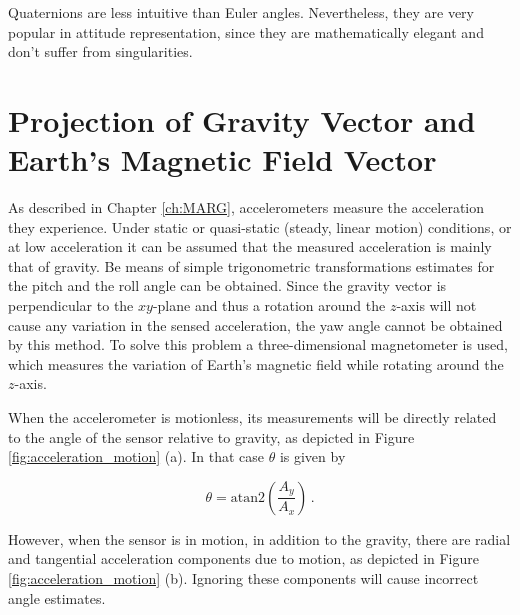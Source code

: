 Quaternions are less intuitive than Euler angles. Nevertheless, they are very popular in attitude representation, since they are mathematically elegant and don't suffer from singularities.

\section{Projection of Gravity Vector and Earth's Magnetic Field Vector}

As described in Chapter \ref{ch:MARG}, accelerometers measure the acceleration they experience. Under static or quasi-static (steady, linear motion) conditions, or at low acceleration it can be assumed that the measured acceleration is mainly that of gravity. Be means of simple trigonometric transformations estimates for the pitch and the roll angle can be obtained. Since the gravity vector is perpendicular to the $xy$-plane and thus a rotation around the $z$-axis will not cause any variation in the sensed acceleration, the yaw angle cannot be obtained by this method. To solve this problem a three-dimensional magnetometer is used, which measures the variation of Earth's magnetic field while rotating around the $z$-axis.

When the accelerometer is motionless, its measurements will be directly related to the angle of the sensor relative to gravity, as depicted in Figure \ref{fig:acceleration_motion} (a). In that case $\theta$ is given by

\begin{equation}
  \theta = \mbox{atan2}(\frac{A_y}{A_x})\,.
\end{equation}

\noindent
However, when the sensor is in motion, in addition to the gravity, there are radial and tangential acceleration components due to motion, as depicted in Figure \ref{fig:acceleration_motion} (b). Ignoring these components will cause incorrect angle estimates.

